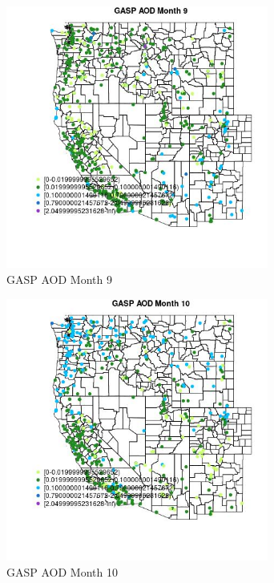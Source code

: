 \begin{figure} 
\centering  
\includegraphics[width=0.77\textwidth]{Code_Outputs/Report_ML_input_PM25_Step4_part_e_de_duplicated_aves_compiled_2019-05-14wNAs_MapObsMo9GASP_AOD.jpg} 
\caption{\label{fig:Report_ML_input_PM25_Step4_part_e_de_duplicated_aves_compiled_2019-05-14wNAsMapObsMo9GASP_AOD}GASP AOD Month 9} 
\end{figure} 
 

\begin{figure} 
\centering  
\includegraphics[width=0.77\textwidth]{Code_Outputs/Report_ML_input_PM25_Step4_part_e_de_duplicated_aves_compiled_2019-05-14wNAs_MapObsMo10GASP_AOD.jpg} 
\caption{\label{fig:Report_ML_input_PM25_Step4_part_e_de_duplicated_aves_compiled_2019-05-14wNAsMapObsMo10GASP_AOD}GASP AOD Month 10} 
\end{figure} 
 

